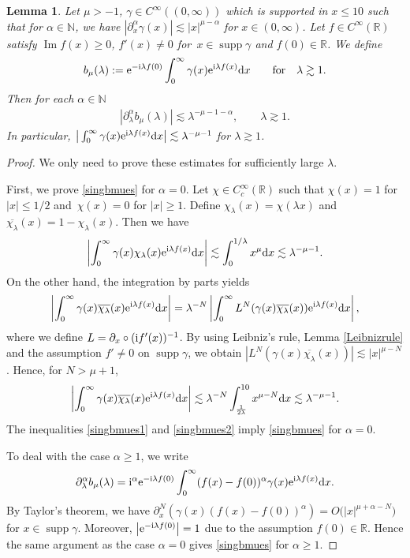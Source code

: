 \documentclass[10pt,a4paper]{amsart}
\numberwithin{equation}{section}
\newtheorem{Lemma}[Theorem]{Lemma}
\def\R{\mathbb{R}}%
\DeclareMathOperator{\supp}{supp}%
\DeclareMathOperator{\im}{Im}%
\def\a{\alpha}
\def\c{\gamma}
\def\l{\lambda}
\def\m{\mu}
\def\pa{\partial}
\begin{document}
\begin{Lemma}\label{singularasym}
Let $\m>-1$, $\c\in C^{\infty}((0,\infty))$ which is supported in $x\leq 10$ such that for $\a\in\mathbb{N}$, we have $|\pa_x^{\a}\c(x)|\lesssim |x|^{\m-\a}$ for $x\in (0,\infty)$. Let $f\in C^{\infty}(\R)$ satisfy $\im f(x)\geq 0$, $f'(x)\neq 0$ for~${x\in \supp \c}$ and $f(0)\in \R$. We define
\begin{align*}
b_{\m}(\l):={\rm e}^{-{\rm i}\l f(0)}\int_{0}^{\infty}\c(x){\rm e}^{{\rm i}\l f(x)}{\rm d}x\qquad \text{for}\quad \l\gtrsim 1.
\end{align*}
Then for each $\a\in\mathbb{N}$
\begin{align}\label{singbmues}
|\partial_{\l}^{\a}b_{\m}(\l)|\lesssim \l^{-\m-1-\a},\qquad \l\gtrsim 1.
\end{align}
In particular, $\big|\int_{0}^{\infty}\c(x){\rm e}^{{\rm i}\l f(x)}{\rm d}x\big|\lesssim \l^{-\m-1}$ for $\l\gtrsim 1$.
\end{Lemma}

\begin{proof}
We only need to prove these estimates for sufficiently large $\l$.

First, we prove \eqref{singbmues} for $\a=0$. Let $\chi\in C_c^{\infty}(\R)$ such that $\chi(x)=1$ for $|x|\leq 1/2$ and~${\chi(x)=0}$ for $|x|\geq 1$. Define $\chi_{\l}(x)=\chi(\l x)$ and $\overline{\chi_\l}(x)=1-\chi_{\l}(x)$. Then we have
\begin{align}\label{singbmues1}
\left|\int_{0}^{\infty}\c(x)\chi_{\l}(x){\rm e}^{{\rm i}\l f(x)}{\rm d}x\right|\lesssim \int_{0}^{1/\l}x^{\m}{\rm d}x\lesssim {\l}^{-\m-1}.
\end{align}
On the other hand, the integration by parts yields
\begin{align*}
\left|\int_{0}^{\infty}\c(x)\overline{\chi_{\l}}(x){\rm e}^{{\rm i}\l f(x)}{\rm d}x\right|=\l^{-N}\left|\int_{0}^{\infty}L^N(\c(x)\overline{\chi_{\l}}(x)){\rm e}^{{\rm i}\l f(x)}{\rm d}x\right|,
\end{align*}
where we define $L=\pa_x\circ ({\rm i}f'(x))^{-1}$. By using Leibniz's rule, Lemma \ref{Leibnizrule} and the assumption $f'\neq 0$ on $\supp \c$, we obtain $|L^{N}(\c(x)\overline{\chi_\l}(x))|\lesssim |x|^{\m-N}$. Hence, for $N>\m+1$,
\begin{align}\label{singbmues2}
\left|\int_{0}^{\infty}\c(x)\overline{\chi_{\l}}(x){\rm e}^{{\rm i}\l f(x)}{\rm d}x\right|\lesssim \l^{-N}\int_{\frac{1}{2\l}}^{10}x^{\m-N}{\rm d}x \lesssim \l^{-\m-1}.
\end{align}
The inequalities \eqref{singbmues1} and \eqref{singbmues2} imply \eqref{singbmues} for $\a=0$.

To deal with the case $\a\geq 1$, we write
\begin{align*}
\pa_{\l}^{\a}b_{\m}(\l)={\rm i}^{\a}{\rm e}^{-{\rm i}\l f(0)}\int_0^{\infty}(f(x)-f(0))^{\a}\c(x){\rm e}^{{\rm i}\l f(x)}{\rm d}x.
\end{align*}
By Taylor's theorem, we have $\pa_x^{N}(\c(x)(f(x)-f(0))^{\a})=O\bigl(|x|^{\m+\a-N}\bigr)$ for $x\in \supp \c$. Moreover, $\big|{\rm e}^{-{\rm i}\l f(0)}\big|=1$ due to the assumption $f(0)\in \R$.
Hence the same argument as the case $\a=0$ gives \eqref{singbmues} for $\a\geq 1$.
\end{proof}
\end{document}
